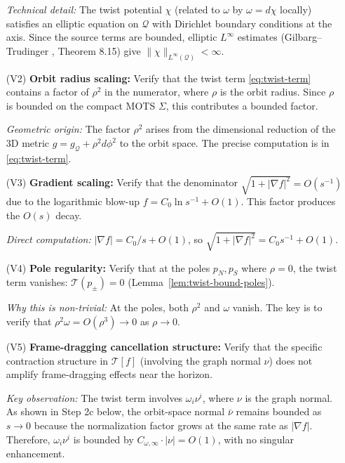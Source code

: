 \begin{remark}
\begin{enumerate}
    \textit{Technical detail:} The twist potential $\chi$ (related to $\omega$ by $\omega = d\chi$ locally) satisfies an elliptic equation on $\mathcal{Q}$ with Dirichlet boundary conditions at the axis. Since the source terms are bounded, elliptic $L^\infty$ estimates (Gilbarg--Trudinger \cite{gilbargtrudinger2001}, Theorem 8.15) give $\|\chi\|_{L^\infty(\mathcal{Q})} < \infty$.
    
    \item[(V2)] \textbf{Orbit radius scaling:} Verify that the twist term \eqref{eq:twist-term} contains a factor of $\rho^2$ in the numerator, where $\rho$ is the orbit radius. Since $\rho$ is bounded on the compact MOTS $\Sigma$, this contributes a bounded factor.
    
    \textit{Geometric origin:} The factor $\rho^2$ arises from the dimensional reduction of the 3D metric $g = g_{\mathcal{Q}} + \rho^2 d\phi^2$ to the orbit space. The precise computation is in \eqref{eq:twist-term}.
    
    \item[(V3)] \textbf{Gradient scaling:} Verify that the denominator $\sqrt{1 + |\nabla f|^2} = O(s^{-1})$ due to the logarithmic blow-up $f = C_0 \ln s^{-1} + O(1)$. This factor produces the $O(s)$ decay.
    
    \textit{Direct computation:} $|\nabla f| = C_0/s + O(1)$, so $\sqrt{1 + |\nabla f|^2} = C_0 s^{-1} + O(1)$.
    
    \item[(V4)] \textbf{Pole regularity:} Verify that at the poles $p_N, p_S$ where $\rho = 0$, the twist term vanishes: $\mathcal{T}(p_\pm) = 0$ (Lemma~\ref{lem:twist-bound-poles}).
    
    \textit{Why this is non-trivial:} At the poles, both $\rho^2$ and $\omega$ vanish. The key is to verify that $\rho^2 \omega = O(\rho^3) \to 0$ as $\rho \to 0$.
    
    \item[(V5)] \textbf{Frame-dragging cancellation structure:} Verify that the specific contraction structure in $\mathcal{T}[f]$ (involving the graph normal $\nu$) does not amplify frame-dragging effects near the horizon.
    
    \textit{Key observation:} The twist term involves $\omega_i \nu^i$, where $\nu$ is the graph normal. As shown in Step 2c below, the orbit-space normal $\bar{\nu}$ remains bounded as $s \to 0$ because the normalization factor grows at the same rate as $|\nabla f|$. Therefore, $\omega_i \nu^i$ is bounded by $C_{\omega,\infty} \cdot |\nu| = O(1)$, with no singular enhancement.
    

\end{enumerate}
\end{remark}
